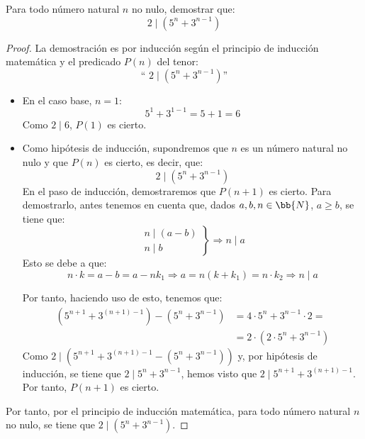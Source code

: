 


\begin{ejercicio}\label{ej:2dividea}
    Para todo número natural $n$ no nulo, demostrar que:
    $$2\mid \left(5^n + 3^{n-1}\right)$$

    \begin{proof}
        La demostración es por inducción según el principio de inducción matemática y el predicado $P(n)$ del tenor:
        $$\text{`` }2\mid \left(5^n + 3^{n-1}\right)\text{''}$$

        \begin{itemize}
            \item En el caso base, $n=1$:
                $$5^1 + 3^{1-1} = 5+1 = 6$$
                Como $2\mid 6$, $P(1)$ es cierto.

            \item Como hipótesis de inducción, supondremos que $n$ es un número natural no nulo y que $P(n)$ es cierto, es decir, que:
                $$2\mid \left(5^n + 3^{n-1}\right)$$
                En el paso de inducción, demostraremos que $P(n+1)$ es cierto.
                Para demostrarlo, antes tenemos en cuenta que, dados $a,b,n\in \bb{N}$, $a\geq b$, se tiene que:
                \begin{equation*}
                    \left.\begin{array}{l}
                        n\mid (a-b) \\
                        n\mid b
                    \end{array} \right\} \Longrightarrow n\mid a
                \end{equation*}
                Esto se debe a que:
                \begin{equation*}
                    n\cdot k = a-b = a-nk_1 \Longrightarrow a = n(k+k_1) = n\cdot k_2 \Longrightarrow n\mid a
                \end{equation*}

                Por tanto, haciendo uso de esto, tenemos que:
                \begin{align*}
                    \left(5^{n+1} + 3^{(n+1)-1}\right) - \left(5^n + 3^{n-1}\right) &=
                     4 \cdot 5^n + 3^{n-1}\cdot 2 =\\
                    &= 2 \cdot \left(2\cdot 5^n + 3^{n-1}\right)
                \end{align*}
                Como $2\mid \left(5^{n+1} + 3^{(n+1)-1} - \left(5^n + 3^{n-1}\right)\right)$ y, por hipótesis de inducción, se tiene que  $2\mid 5^n + 3^{n-1}$, hemos visto que $2\mid 5^{n+1} + 3^{(n+1)-1}$.
                Por tanto, $P(n+1)$ es cierto. 
                
            \end{itemize}
            Por tanto, por el principio de inducción matemática, para todo número natural $n$ no nulo, se tiene que $2\mid \left(5^n + 3^{n-1}\right)$.
    \end{proof}
\end{ejercicio}


